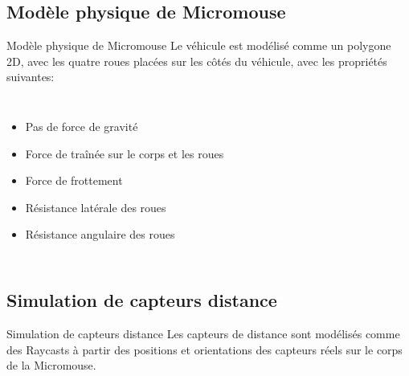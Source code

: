 \documentclass{beamer}
\begin{document}
\subsection{Modèle physique de Micromouse}
\begin{frame}{Modèle physique de Micromouse}
Le véhicule est modélisé comme un polygone 2D, avec les quatre roues placées sur les côtés du véhicule, avec les propriétés suivantes:
\begin{columns}[c]
\begin{itemize}
    \item Pas de force de gravité
    \item Force de traînée sur le corps et les roues
    \item Force de frottement
    \item Résistance latérale des roues
    \item Résistance angulaire des roues
\end{itemize}


\end{columns}
\end{frame}

\subsection{Simulation de capteurs distance}
\begin{frame}{Simulation de capteurs distance}
Les capteurs de distance sont modélisés comme des Raycasts à partir des positions et orientations des capteurs réels sur le corps de la Micromouse.

\end{frame}
\end{document}
